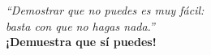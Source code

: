 \clearpage
\thispagestyle{plain}  %
\vspace*{15cm}         %

\begin{flushright}
{\LARGE %
\textit{“Demostrar que no puedes es muy fácil:}\\
\textit{basta con que no hagas nada.”}\\[14pt]
\textbf{¡Demuestra que sí puedes!}}
\end{flushright}

\clearpage
